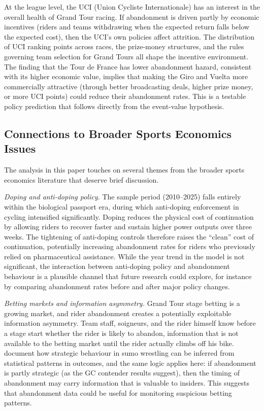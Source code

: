 At the league level, the UCI (Union Cycliste Internationale) has an interest in the overall health of Grand Tour racing. If abandonment is driven partly by economic incentives (riders and teams withdrawing when the expected return falls below the expected cost), then the UCI's own policies affect attrition. The distribution of UCI ranking points across races, the prize-money structures, and the rules governing team selection for Grand Tours all shape the incentive environment. The finding that the Tour de France has lower abandonment hazard, consistent with its higher economic value, implies that making the Giro and Vuelta more commercially attractive (through better broadcasting deals, higher prize money, or more UCI points) could reduce their abandonment rates. This is a testable policy prediction that follows directly from the event-value hypothesis.

\subsection{Connections to Broader Sports Economics Issues}

The analysis in this paper touches on several themes from the broader sports economics literature that deserve brief discussion.

\emph{Doping and anti-doping policy.} The sample period (2010--2025) falls entirely within the biological passport era, during which anti-doping enforcement in cycling intensified significantly. Doping reduces the physical cost of continuation by allowing riders to recover faster and sustain higher power outputs over three weeks. The tightening of anti-doping controls therefore raises the ``clean'' cost of continuation, potentially increasing abandonment rates for riders who previously relied on pharmaceutical assistance. While the year trend in the model is not significant, the interaction between anti-doping policy and abandonment behaviour is a plausible channel that future research could explore, for instance by comparing abandonment rates before and after major policy changes.

\emph{Betting markets and information asymmetry.} Grand Tour stage betting is a growing market, and rider abandonment creates a potentially exploitable information asymmetry. Team staff, soigneurs, and the rider himself know before a stage start whether the rider is likely to abandon, information that is not available to the betting market until the rider actually climbs off his bike. \textcite{duggan2002sumo} document how strategic behaviour in sumo wrestling can be inferred from statistical patterns in outcomes, and the same logic applies here: if abandonment is partly strategic (as the GC contender results suggest), then the timing of abandonment may carry information that is valuable to insiders. This suggests that abandonment data could be useful for monitoring suspicious betting patterns.

